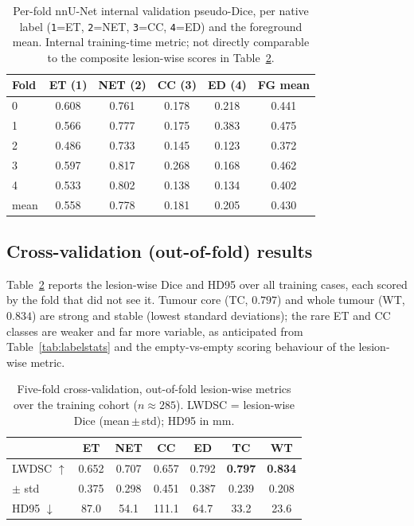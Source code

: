 \documentclass[11pt,a4paper]{article}
\newcommand{\result}[2]{#2}
\begin{document}
\begin{table}[h]
\centering
\caption{Per-fold nnU-Net internal validation pseudo-Dice, per native label
(\texttt{1}=ET, \texttt{2}=NET, \texttt{3}=CC, \texttt{4}=ED) and the foreground mean.
Internal training-time metric; not directly comparable to the composite lesion-wise
scores in Table~\ref{tab:cv}.}
\label{tab:perfold}
\begin{tabular}{lccccc}
\toprule
Fold & ET (1) & NET (2) & CC (3) & ED (4) & FG mean \\
\midrule
0 & 0.608 & 0.761 & 0.178 & 0.218 & 0.441 \\
1 & 0.566 & 0.777 & 0.175 & 0.383 & 0.475 \\
2 & 0.486 & 0.733 & 0.145 & 0.123 & 0.372 \\
3 & 0.597 & 0.817 & 0.268 & 0.168 & 0.462 \\
4 & 0.533 & 0.802 & 0.138 & 0.134 & 0.402 \\
\midrule
mean & 0.558 & 0.778 & 0.181 & 0.205 & 0.430 \\
\bottomrule
\end{tabular}
\end{table}

\subsection{Cross-validation (out-of-fold) results}
Table~\ref{tab:cv} reports the lesion-wise Dice and HD95 over all training cases,
each scored by the fold that did not see it. Tumour core (TC, $0.797$) and whole
tumour (WT, $0.834$) are strong and stable (lowest standard deviations); the rare
ET and CC classes are weaker and far more variable, as anticipated from
Table~\ref{tab:labelstats} and the empty-vs-empty scoring behaviour of the
lesion-wise metric.

\begin{table}[h]
\centering
\caption{Five-fold cross-validation, out-of-fold lesion-wise metrics over the
training cohort ($n\!\approx\!285$). LWDSC = lesion-wise Dice (mean\,$\pm$\,std);
HD95 in mm.}
\label{tab:cv}
\begin{tabular}{lcccccc}
\toprule
 & ET & NET & CC & ED & \textbf{TC} & \textbf{WT} \\
\midrule
LWDSC $\uparrow$ & \result{ET}{0.652} & \result{NET}{0.707} & \result{CC}{0.657}
                 & \result{ED}{0.792} & \textbf{\result{TC}{0.797}} & \textbf{\result{WT}{0.834}} \\
\;\;$\pm$ std    & 0.375 & 0.298 & 0.451 & 0.387 & 0.239 & 0.208 \\
HD95 $\downarrow$ & 87.0 & 54.1 & 111.1 & 64.7 & 33.2 & 23.6 \\
\bottomrule
\end{tabular}
\end{table}
\end{document}
